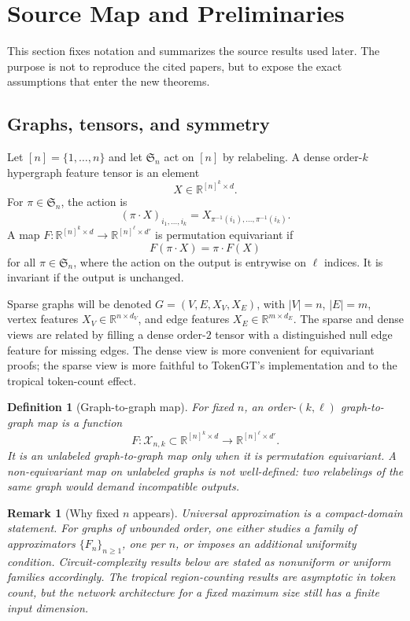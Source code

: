 \documentclass[11pt]{article}
\newtheorem{definition}[theorem]{Definition}
\newtheorem{remark}[theorem]{Remark}
\newcommand{\R}{\mathbb{R}}
\newcommand{\Sn}{\mathfrak{S}_n}
\newcommand{\cX}{\mathcal{X}}
\begin{document}
\section{Source Map and Preliminaries}

This section fixes notation and summarizes the source results used later.  The purpose is not to reproduce the cited papers, but to expose the exact assumptions that enter the new theorems.

\subsection{Graphs, tensors, and symmetry}

Let $[n]=\{1,\dots,n\}$ and let $\Sn$ act on $[n]$ by relabeling.  A dense order-$k$ hypergraph feature tensor is an element
\[
  X\in \R^{[n]^k\times d}.
\]
For $\pi\in \Sn$, the action is
\[
  (\pi\cdot X)_{i_1,\dots,i_k}
  =X_{\pi^{-1}(i_1),\dots,\pi^{-1}(i_k)}.
\]
A map $F:\R^{[n]^k\times d}\to \R^{[n]^\ell\times d'}$ is permutation equivariant if
\[
  F(\pi\cdot X)=\pi\cdot F(X)
\]
for all $\pi\in\Sn$, where the action on the output is entrywise on $\ell$ indices.  It is invariant if the output is unchanged.

Sparse graphs will be denoted $G=(V,E,X_V,X_E)$, with $|V|=n$, $|E|=m$, vertex features $X_V\in \R^{n\times d_V}$, and edge features $X_E\in \R^{m\times d_E}$.  The sparse and dense views are related by filling a dense order-$2$ tensor with a distinguished null edge feature for missing edges.  The dense view is more convenient for equivariant proofs; the sparse view is more faithful to TokenGT's implementation and to the tropical token-count effect.

\begin{definition}[Graph-to-graph map]
For fixed $n$, an \emph{order-$(k,\ell)$ graph-to-graph map} is a function
\[
  F:\cX_{n,k}\subset \R^{[n]^k\times d}\longrightarrow \R^{[n]^\ell\times d'}.
\]
It is an unlabeled graph-to-graph map only when it is permutation equivariant.  A non-equivariant map on unlabeled graphs is not well-defined: two relabelings of the same graph would demand incompatible outputs.
\end{definition}

\begin{remark}[Why fixed $n$ appears]
Universal approximation is a compact-domain statement.  For graphs of unbounded order, one either studies a family of approximators $\{F_n\}_{n\ge 1}$, one per $n$, or imposes an additional uniformity condition.  Circuit-complexity results below are stated as nonuniform or uniform families accordingly.  The tropical region-counting results are asymptotic in token count, but the network architecture for a fixed maximum size still has a finite input dimension.
\end{remark}
\end{document}
